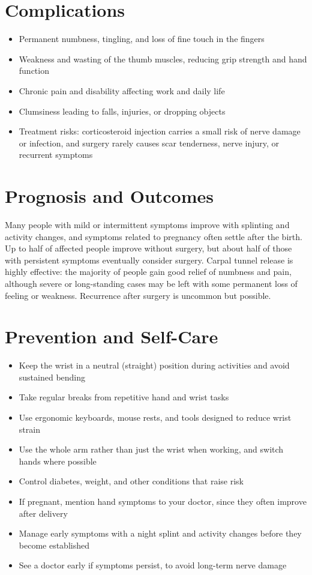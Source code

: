 \section*{Complications}
\begin{itemize}
    \item Permanent numbness, tingling, and loss of fine touch in the fingers
    \item Weakness and wasting of the thumb muscles, reducing grip strength and hand function
    \item Chronic pain and disability affecting work and daily life
    \item Clumsiness leading to falls, injuries, or dropping objects
    \item Treatment risks: corticosteroid injection carries a small risk of nerve damage or infection, and surgery rarely causes scar tenderness, nerve injury, or recurrent symptoms
\end{itemize}

\section*{Prognosis and Outcomes}
Many people with mild or intermittent symptoms improve with splinting and activity changes, and symptoms related to pregnancy often settle after the birth. Up to half of affected people improve without surgery, but about half of those with persistent symptoms eventually consider surgery. Carpal tunnel release is highly effective: the majority of people gain good relief of numbness and pain, although severe or long-standing cases may be left with some permanent loss of feeling or weakness. Recurrence after surgery is uncommon but possible.

\section*{Prevention and Self-Care}
\begin{itemize}
    \item Keep the wrist in a neutral (straight) position during activities and avoid sustained bending
    \item Take regular breaks from repetitive hand and wrist tasks
    \item Use ergonomic keyboards, mouse rests, and tools designed to reduce wrist strain
    \item Use the whole arm rather than just the wrist when working, and switch hands where possible
    \item Control diabetes, weight, and other conditions that raise risk
    \item If pregnant, mention hand symptoms to your doctor, since they often improve after delivery
    \item Manage early symptoms with a night splint and activity changes before they become established
    \item See a doctor early if symptoms persist, to avoid long-term nerve damage
\end{itemize}

